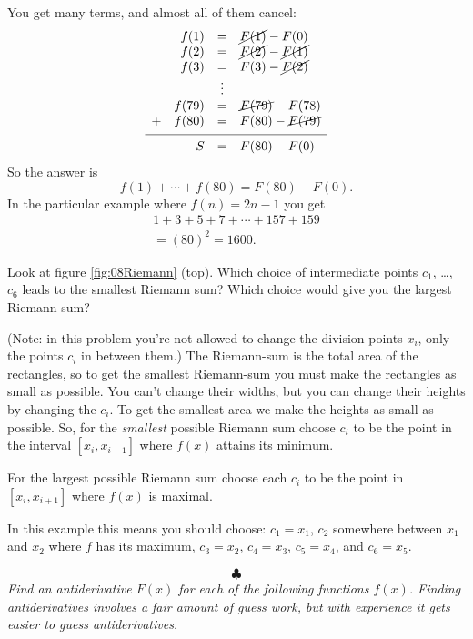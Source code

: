 \begin{multicols}{2}
You get many terms, and almost all of them cancel:
\[
\begin{array}{lrcl}
  &f(1) & = & \cancel{F(1)} - F(0) \\
  &f(2) & = & \cancel{F(2)} - \cancel{F(1)} \\
  &f(3) & = & F(3) - \cancel{F(2)} \\
   && \vdots &\\
   &f(79) & = & \cancel{F(79)} - F(78) \\
   +&f(80) & = & F(80) - \cancel{F(79)} \\[4pt]
  \hline      
  &\rule{0pt}{12pt}
  S & = & F(80) - F(0) \\
\end{array}
\]
So the answer is 
\[
  f(1)+\cdots+f(80) = F(80) - F(0).
\]
In the particular example where $f(n)= 2n-1$ you get
\begin{multline*}
  1+3+5+7+\cdots+157+159 \\
  = (80)^2 = 1600.
\end{multline*}
\endanswer

\problem \groupproblem Look at figure \ref{fig:08Riemann} (top). %
Which choice of intermediate points $c_1$, \ldots, $c_6$ leads to the
smallest Riemann sum?  Which choice would give you the largest
Riemann-sum?

(Note: in this problem you're not allowed to change the division points
$x_i$, only the points $c_i$ in between them.)
\answer %
The Riemann-sum is the total area of the rectangles, so to get the
smallest Riemann-sum you must make the rectangles as small as
possible.  You can't change their widths, but you can change their
heights by changing the $c_i$.  To get the smallest area we make the
heights as small as possible. So, for the \emph{smallest} possible
Riemann sum choose  $c_i$ to be the point in the interval $[x_i,
x_{i+1}]$ where $f(x)$ attains its minimum.

For the largest possible Riemann sum choose each $c_i$ to be the point
in $[x_i, x_{i+1}]$ where $f(x)$ is maximal.

In this example this means you should choose:  $c_1 = x_1$, $c_2$ somewhere
between $x_1$ and $x_2$ where $f$ has its maximum, $c_3=x_2$, $c_4=x_3$,
$c_5=x_4$, and $c_6 = x_5$.

\endanswer
%
\[
\clubsuit
\]
\begingroup
  \itshape Find an antiderivative $F(x)$ for each of the following
  functions $f(x)$.  Finding antiderivatives involves a fair amount of
  guess work, but with experience it gets easier to guess
  antiderivatives.
\endgroup



\end{multicols}
